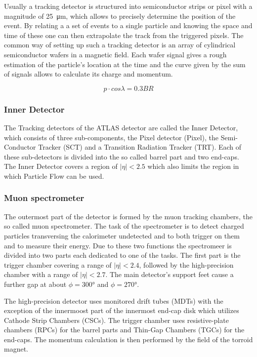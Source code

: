 Usually a tracking detector is structured into semiconductor strips or pixel with a magnitude of \SI{25}{\micro \metre}, which allows to precisely determine the position of the event. By relating a a set of events to a single particle and knowing the space and time of these one can then extrapolate the track from the triggered pixels. The common way of setting up such a tracking detector is an array of cylindrical semiconductor wafers in a magnetic field. Each wafer signal gives a rough estimation of the particle's location at the time and the curve given by the sum of signals allows to calculate its charge and momentum.

\begin{equation}
p \cdot cos \lambda = 0.3 BR
\end{equation}


\subsubsection{Inner Detector}

The Tracking detectors of the ATLAS detector are called the Inner Detector, which consists of three sub-components, the Pixel detector (Pixel), the Semi-Conductor Tracker (SCT) and a Transition Radiation Tracker (TRT). Each of these sub-detectors is divided into the so called barrel part and two end-caps. The Inner Detector covers a region of $|\eta| < \num{2.5}$ which also limits the region in which Particle Flow can be used.

\subsubsection{Muon spectrometer}

The outermost part of the detector is formed by the muon tracking chambers, the so called muon spectrometer. The task of the spectrometer is to detect charged particles transversing the calorimeter undetected and to both trigger on them and to measure their energy. Due to these two functions the spectromeer is divided into two parts each dedicated to one of the tasks. The first part is the trigger chamber covering a range of $|\eta|<2.4$, followed by the high-precision chamber with a range of $|\eta|<2.7$. The main detector's support feet cause a further gap at about $\phi = \ang{300}$ and $\phi = \ang{270}$. 

The high-precision detector uses monitored drift tubes (MDTs) with the exception of the innermoost part of the innermost end-cap disk which utilizes Cathode Strip Chambers (CSCs). The trigger chamber uses resistive-plate chambers (RPCs) for the barrel parts and Thin-Gap Chambers (TGCs) for the end-caps. The momentum calculation is then performed by the field of the torroid magnet.

